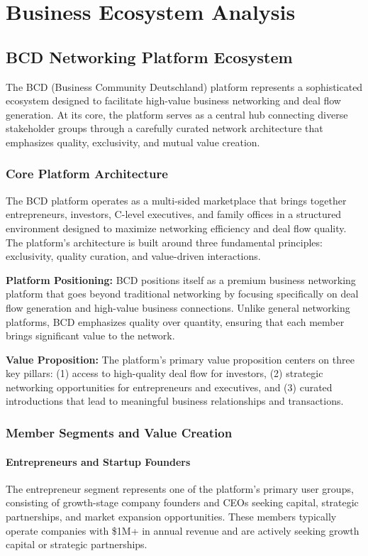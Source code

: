 \chapter{Business Ecosystem Analysis}

\section{BCD Networking Platform Ecosystem}

The BCD (Business Community Deutschland) platform represents a sophisticated ecosystem designed to facilitate high-value business networking and deal flow generation. At its core, the platform serves as a central hub connecting diverse stakeholder groups through a carefully curated network architecture that emphasizes quality, exclusivity, and mutual value creation.

\subsection{Core Platform Architecture}

The BCD platform operates as a multi-sided marketplace that brings together entrepreneurs, investors, C-level executives, and family offices in a structured environment designed to maximize networking efficiency and deal flow quality. The platform's architecture is built around three fundamental principles: exclusivity, quality curation, and value-driven interactions.

\textbf{Platform Positioning:} BCD positions itself as a premium business networking platform that goes beyond traditional networking by focusing specifically on deal flow generation and high-value business connections. Unlike general networking platforms, BCD emphasizes quality over quantity, ensuring that each member brings significant value to the network.

\textbf{Value Proposition:} The platform's primary value proposition centers on three key pillars: (1) access to high-quality deal flow for investors, (2) strategic networking opportunities for entrepreneurs and executives, and (3) curated introductions that lead to meaningful business relationships and transactions.

\subsection{Member Segments and Value Creation}

\subsubsection{Entrepreneurs and Startup Founders}
The entrepreneur segment represents one of the platform's primary user groups, consisting of growth-stage company founders and CEOs seeking capital, strategic partnerships, and market expansion opportunities. These members typically operate companies with \$1M+ in annual revenue and are actively seeking growth capital or strategic partnerships.

